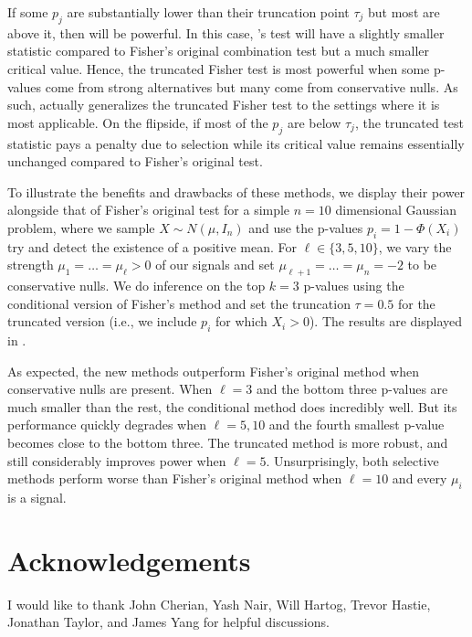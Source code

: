 \documentclass{article}
\begin{document}
If some $p_j$ are substantially lower than their truncation point $\tau_j$ but most are above it, then  will be powerful. In this case, 's test will have a slightly smaller statistic compared to Fisher's original combination test but a much smaller critical value. Hence, the truncated Fisher test is most powerful when some p-values come from strong alternatives but many come from conservative nulls. As such,  actually generalizes the truncated Fisher test to the settings where it is most applicable. On the flipside, if most of the $p_j$ are below $\tau_j$, the truncated test statistic pays a penalty due to selection while its critical value remains essentially unchanged compared to Fisher's original test. 

To illustrate the benefits and drawbacks of these methods, we display their power alongside that of Fisher's original test for a simple $n=10$ dimensional Gaussian problem, where we sample $X \sim N(\mu, I_n)$ and use the p-values $p_i = 1 - \Phi(X_i)$ try and detect the existence of a positive mean. For $\ell \in \{3, 5, 10\}$, we vary the strength $\mu_1 = \dots = \mu_{\ell} > 0$ of our signals and set $\mu_{\ell + 1} = \dots = \mu_n = -2$ to be conservative nulls. We do inference on the top $k=3$ p-values using the conditional version of Fisher's method and set the truncation $\tau = 0.5$ for the truncated version (i.e., we include $p_i$ for which $X_i > 0$). The results are displayed in .

As expected, the new methods outperform Fisher's original method when conservative nulls are present. When $\ell=3$ and the bottom three p-values are much smaller than the rest, the conditional method does incredibly well. But its performance quickly degrades when $\ell = 5, 10$ and the fourth smallest p-value becomes close to the bottom three. The truncated method is more robust, and still considerably improves power when $\ell=5$. Unsurprisingly, both selective methods perform worse than Fisher's original method when $\ell=10$ and every $\mu_i$ is a signal. 


\section*{Acknowledgements}
I would like to thank John Cherian, Yash Nair, Will Hartog, Trevor Hastie, Jonathan Taylor, and James Yang for helpful discussions.



\end{document}
